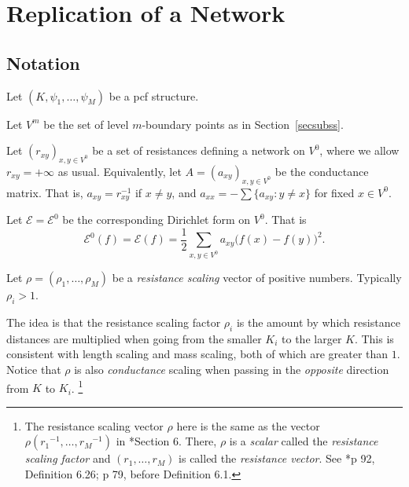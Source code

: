 \documentclass[a4paper]{amsart}
\theoremstyle{plain}
\theoremstyle{definition}
\theoremstyle{remark}
\begin{document}

\section{\textbf{Replication of a Network}}\label{secrt}

\subsection{Notation}\label{secnotr}
Let    $  (K,\psi_1,\dots, \psi_M) $ be a  pcf structure.

Let $ V^{m} $ be the set of level $ m $-boundary points as in Section~\ref{secsubss}.   

\medskip Let $ (r_{xy})_{x,y\in V^{0}} $ be a set of resistances defining  a network on $ V^{0} $,   where we allow $ r_{xy} =+\infty$ as usual.  Equivalently, let $ A=(a_{xy})_{x,y\in V^{0}} $ be the conductance matrix.  That is, $  a_{xy} = r_{xy}^{-1} $ if $ x\neq y $,  and  $ a_{xx} = -\sum \{ a_{xy} : y \neq x \} $ for fixed  $ x \in V^{0} $. 


Let $ \mathcal{E} = \mathcal{E} ^{0} $ be the corresponding Dirichlet form on $ V^{0} $. That is
\begin{equation} \label{}
\boxed{ \mathcal{E} ^{0} (f) = \mathcal{E} (f) = \frac{1}{2} \sum_{x,y\in V^{0}} a_{xy} \big(f(x) - f(y)\big)^2.}
\end{equation} 

\medskip   Let $\rho =  (\rho_1,\dots, \rho_M) $ be  a \emph{resistance scaling} vector  of positive numbers. Typically $ \rho_i > 1 $. 

The idea is that the resistance scaling factor $ \rho_i $ is the amount by which resistance distances are multiplied when going from the smaller $  K_i $ to the larger $ K $.  This is consistent  with length scaling and mass scaling, both of which are  greater than $ 1 $.  Notice that $ \rho $ is also \emph{conductance} scaling when passing in the \emph{opposite} direction from $ K $ to $ K_i$.%
\footnote
{The resistance scaling vector $ \rho $ here  is the same as the vector $\rho (    {r_1}^{-1},\dots,  {r_M}^{-1}) $ in   \cite{Bar1}*{Section 6}.  There,  $ \rho $ is a \emph{scalar} called  the \emph{resistance scaling factor}  and $( r_1 ,\dots, r_M ) $ is called the \emph{resistance vector}. See \cite{Bar1}*{p 92, Definition 6.26; p 79, before Definition 6.1}.}
\end{document}

